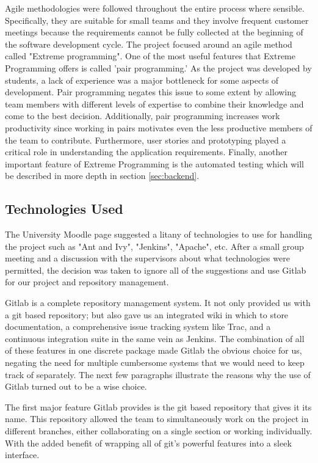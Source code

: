 \documentclass{l3proj}
\begin{document}
Agile methodologies were followed throughout the entire process where sensible. Specifically, they are suitable for small teams and they involve frequent customer meetings because the requirements cannot be fully collected at the beginning of the software development cycle. The project focused around an agile method called "Extreme programming". One of the most useful features that Extreme Programming offers is called 'pair programming.' As the project was developed by students, a lack of experience was a major bottleneck for some aspects of development. Pair programming negates this issue to some extent by allowing team members with different levels of expertise to combine their knowledge and come to the best decision. Additionally, pair programming increases work productivity since working in pairs motivates even the less productive members of the team to contribute. Furthermore, user stories and prototyping played a critical role in understanding the application requirements. Finally, another important feature of Extreme Programming is the automated testing which will be described in more depth in section \ref{sec:backend}.

\subsection{Technologies Used}
\label{sec:tech}

The University Moodle page suggested a litany of technologies to use for handling the project such as "Ant and Ivy", "Jenkins", "Apache", etc. After a small group meeting and a discussion with the supervisors about what technologies were permitted, the decision was taken to ignore all of the suggestions and use Gitlab \cite{Gitlab} for our project and repository management.

Gitlab is a complete repository management system. It not only provided us with a git based repository; but also gave us an integrated wiki in which to store documentation, a comprehensive issue tracking system like Trac, and a continuous integration suite in the same vein as Jenkins. The combination of all of these features in one discrete package made Gitlab the obvious choice for us, negating the need for multiple cumbersome systems that we would need to keep track of separately. The next few paragraphs illustrate the reasons why the use of Gitlab turned out to be a wise choice.

The first major feature Gitlab provides is the git based repository that gives it its name. This repository allowed the team to simultaneously work on the project in different branches, either collaborating on a single section or working individually. With the added benefit of wrapping all of git's powerful features into a sleek interface.
\end{document}
